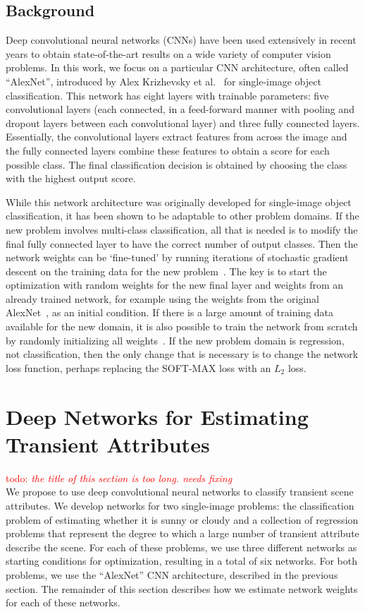 \documentclass[10pt,twocolumn,letterpaper]{article}
\newcommand{\todo}[1]{\textcolor{red}{todo: {\em #1}}}
\begin{document}
\subsection{Background}
\indent
Deep convolutional neural networks (CNNs) have been used extensively in recent
years to obtain state-of-the-art results on a wide variety of computer vision
problems.  In this work, we focus on a particular CNN architecture, often
called ``AlexNet'', introduced by Alex Krizhevsky et al.~\cite{caffenetnips12}
for single-image object classification. This network has eight layers with
trainable parameters: five convolutional layers (each connected, in a
feed-forward manner with pooling and dropout layers between each convolutional
layer) and three fully connected layers. Essentially, the convolutional layers
extract features from across the image and the fully connected layers combine
these features to obtain a score for each possible class. The final
classification decision is obtained by choosing the class with the highest
output score.

While this network architecture was originally developed for single-image
object classification, it has been shown to be adaptable to other problem
domains. If the new problem involves multi-class classification, all that is
needed is to modify the final fully connected layer to have the correct number
of output classes. Then the network weights can be `fine-tuned' by running
iterations of stochastic gradient descent on the training data for the new
problem~\cite{yosinski2014transferable}.  The key is to start the optimization
with random weights for the new final layer and weights from an already trained
network, for example using the weights from the original
AlexNet~\cite{caffenetnips12}, as an initial condition. If there is a large
amount of training data available for the new domain, it is also possible to
train the network from scratch by randomly initializing all
weights~\cite{zhou2014places}.  If the new problem domain is regression, not
classification, then the only change that is necessary is to change the network
loss function, perhaps replacing the SOFT-MAX loss with an $L_2$ loss.

\section{Deep Networks for Estimating Transient Attributes}
\todo{the title of this section is too long. needs fixing} \\
\indent
We propose to use deep convolutional neural networks to classify transient
scene attributes. We develop networks for two single-image problems: the
classification problem of estimating whether it is sunny or cloudy and a
collection of regression problems that represent the degree to which a large
number of transient attribute describe the scene.  For each of these problems,
we use three different networks as starting conditions for optimization,
resulting in a total of six networks.  For both problems, we use the
``AlexNet'' CNN architecture, described in the previous section.  The remainder
of this section describes how we estimate network weights for each of these
networks.
\end{document}
